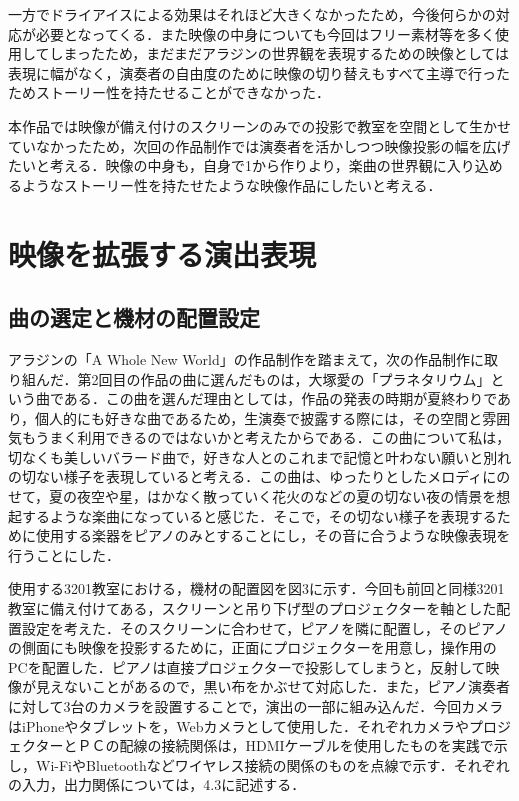 一方でドライアイスによる効果はそれほど大きくなかったため，今後何らかの対応が必要となってくる．また映像の中身についても今回はフリー素材等を多く使用してしまったため，まだまだアラジンの世界観を表現するための映像としては表現に幅がなく，演奏者の自由度のために映像の切り替えもすべて主導で行ったためストーリー性を持たせることができなかった．

本作品では映像が備え付けのスクリーンのみでの投影で教室を空間として生かせていなかったため，次回の作品制作では演奏者を活かしつつ映像投影の幅を広げたいと考える．映像の中身も，自身で1から作りより，楽曲の世界観に入り込めるようなストーリー性を持たせたような映像作品にしたいと考える．


\section{映像を拡張する演出表現}
\subsection{曲の選定と機材の配置設定}
アラジンの「A Whole New World」の作品制作を踏まえて，次の作品制作に取り組んだ．第2回目の作品の曲に選んだものは，大塚愛の「プラネタリウム」という曲である\cite{Planetarium}．この曲を選んだ理由としては，作品の発表の時期が夏終わりであり，個人的にも好きな曲であるため，生演奏で披露する際には，その空間と雰囲気もうまく利用できるのではないかと考えたからである．この曲について私は，切なくも美しいバラード曲で，好きな人とのこれまで記憶と叶わない願いと別れの切ない様子を表現していると考える．この曲は、ゆったりとしたメロディにのせて，夏の夜空や星，はかなく散っていく花火のなどの夏の切ない夜の情景を想起するような楽曲になっていると感じた．そこで，その切ない様子を表現するために使用する楽器をピアノのみとすることにし，その音に合うような映像表現を行うことにした．

使用する3201教室における，機材の配置図を図3に示す．今回も前回と同様3201教室に備え付けてある，スクリーンと吊り下げ型のプロジェクターを軸とした配置設定を考えた．そのスクリーンに合わせて，ピアノを隣に配置し，そのピアノの側面にも映像を投影するために，正面にプロジェクターを用意し，操作用のPCを配置した．ピアノは直接プロジェクターで投影してしまうと，反射して映像が見えないことがあるので，黒い布をかぶせて対応した．また，ピアノ演奏者に対して3台のカメラを設置することで，演出の一部に組み込んだ．今回カメラはiPhoneやタブレットを，Webカメラとして使用した．それぞれカメラやプロジェクターとＰＣの配線の接続関係は，HDMIケーブルを使用したものを実践で示し，Wi-FiやBluetoothなどワイヤレス接続の関係のものを点線で示す．それぞれの入力，出力関係については，4.3に記述する．

